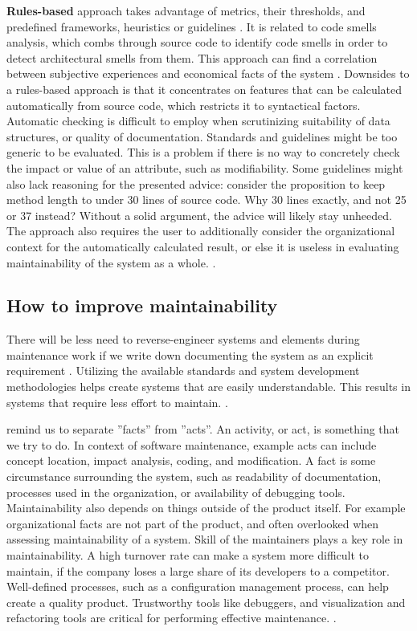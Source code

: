 \documentclass[utf8,english]{gradu3}
\begin{document}
\textbf{Rules-based} approach takes advantage of metrics, their thresholds, and
predefined frameworks, heuristics or guidelines \parencite[8]{Mumtaz2021}. It is
related to code smells analysis, which combs through source code to identify
code smells in order to detect architectural smells from them. This approach can
find a correlation between subjective experiences and economical facts of the
system \parencite[22]{Broy2006}. Downsides to a rules-based approach is that it
concentrates on features that can be calculated automatically from source code,
which restricts it to syntactical factors. Automatic checking is difficult to
employ when scrutinizing suitability of data structures, or quality of
documentation. Standards and guidelines might be too generic to be evaluated.
This is a problem if there is no way to concretely check the impact or value of
an attribute, such as modifiability. Some guidelines might also lack reasoning
for the presented advice: consider the proposition to keep method length to
under 30 lines of source code. Why 30 lines exactly, and not 25 or 37 instead? Without a solid
argument, the advice will likely stay unheeded. The approach also requires the
user to additionally consider the organizational context for the automatically
calculated result, or else it is useless in evaluating maintainability of the
system as a whole. \parencite[22]{Broy2006}.


\subsection{How to improve maintainability}

There will be less need to reverse-engineer systems and elements during
maintenance work if we write down documenting the system as an explicit
requirement \parencite[96]{IEEE12207}. Utilizing the available standards and
system development methodologies helps create systems that are easily
understandable.  This results in systems that require less effort to maintain.
\parencite[608]{Gorla2010}.

\textcite{Broy2006} remind us to separate ''facts'' from ''acts''. An activity,
or act, is something that we try to do. In context of software maintenance, example acts can include concept
location, impact analysis, coding, and modification. A fact is some
circumstance surrounding the system, such as readability of documentation,
processes used in the organization, or availability of debugging tools.
Maintainability also depends on things outside of the product itself.  For
example organizational facts are not part of the product, and often overlooked
when assessing maintainability of a system. Skill of the maintainers plays a key
role in maintainability. A high turnover rate can make a system more difficult
to maintain, if the company loses a large share of its developers to a
competitor. Well-defined processes, such as a configuration management process,
can help create a quality product.  Trustworthy tools like debuggers, and
visualization and refactoring tools are critical for performing effective
maintenance. \parencite[25-26]{Broy2006}.
\end{document}
